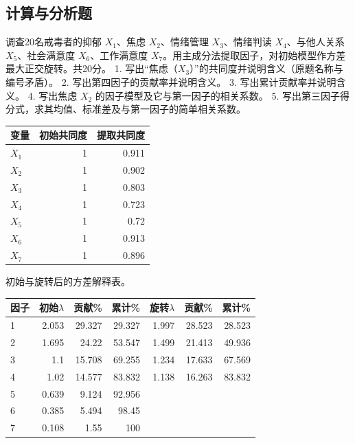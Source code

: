 \subsection{计算与分析题}


调查20名戒毒者的抑郁 \(X_1\)、焦虑 \(X_2\)、情绪管理 \(X_3\)、情绪判读 \(X_4\)、与他人关系 \(X_5\)、社会满意度 \(X_6\)、工作满意度 \(X_7\)。用主成分法提取因子，对初始模型作方差最大正交旋转。共20分。 1. 写出``焦虑（\(X_3\)）''的共同度并说明含义（原题名称与编号矛盾）。 2. 写出第四因子的贡献率并说明含义。 3. 写出累计贡献率并说明含义。 4. 写出焦虑 \(X_2\) 的因子模型及它与第一因子的相关系数。 5. 写出第三因子得分式，求其均值、标准差及与第一因子的简单相关系数。

\begin{center}\small\setlength{\tabcolsep}{4pt}\renewcommand{\arraystretch}{1.18}\begin{tabular}{@{}lrr@{}}
\toprule
变量 & 初始共同度 & 提取共同度 \\
\midrule

\(X_1\) & 1 & 0.911 \\
\(X_2\) & 1 & 0.902 \\
\(X_3\) & 1 & 0.803 \\
\(X_4\) & 1 & 0.723 \\
\(X_5\) & 1 & 0.72 \\
\(X_6\) & 1 & 0.913 \\
\(X_7\) & 1 & 0.896 \\
\bottomrule\end{tabular}\end{center}

初始与旋转后的方差解释表。

\begin{center}\small\setlength{\tabcolsep}{4pt}\renewcommand{\arraystretch}{1.18}\begin{tabular}{@{}lrrrrrr@{}}
\toprule
因子 & 初始\(\lambda\) & 贡献\% & 累计\% & 旋转\(\lambda\) & 贡献\% & 累计\% \\
\midrule

1 & 2.053 & 29.327 & 29.327 & 1.997 & 28.523 & 28.523 \\
2 & 1.695 & 24.22 & 53.547 & 1.499 & 21.413 & 49.936 \\
3 & 1.1 & 15.708 & 69.255 & 1.234 & 17.633 & 67.569 \\
4 & 1.02 & 14.577 & 83.832 & 1.138 & 16.263 & 83.832 \\
5 & 0.639 & 9.124 & 92.956 & & & \\
6 & 0.385 & 5.494 & 98.45 & & & \\
7 & 0.108 & 1.55 & 100 & & & \\
\bottomrule\end{tabular}\end{center}

